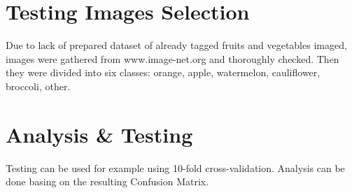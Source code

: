 \documentclass[a4paper, 11pt]{article}
\begin{document}
\section*{Testing Images Selection}
Due to lack of prepared dataset of already tagged fruits and vegetables imaged, images were gathered from www.image-net.org and thoroughly checked. Then they were divided into six classes: orange, apple, watermelon, cauliflower, broccoli, other.

\section*{Analysis \& Testing}
Testing can be used for example using 10-fold cross-validation. Analysis can be done basing on the resulting Confusion Matrix.
\end{document}

